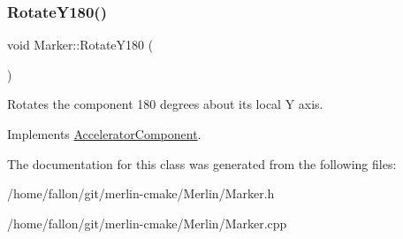 \subsubsection{\texorpdfstring{Rotate\+Y180()}{RotateY180()}}
{\footnotesize\ttfamily void Marker\+::\+Rotate\+Y180 (\begin{DoxyParamCaption}{ }\end{DoxyParamCaption})\hspace{0.3cm}{\ttfamily [virtual]}}

Rotates the component 180 degrees about its local Y axis. 

Implements \hyperlink{classAcceleratorComponent_a8bf0d39b56578ca99f286ca1504b9072}{Accelerator\+Component}.



The documentation for this class was generated from the following files\+:\begin{DoxyCompactItemize}
\item 
/home/fallon/git/merlin-\/cmake/\+Merlin/Marker.\+h\item 
/home/fallon/git/merlin-\/cmake/\+Merlin/Marker.\+cpp\end{DoxyCompactItemize}
